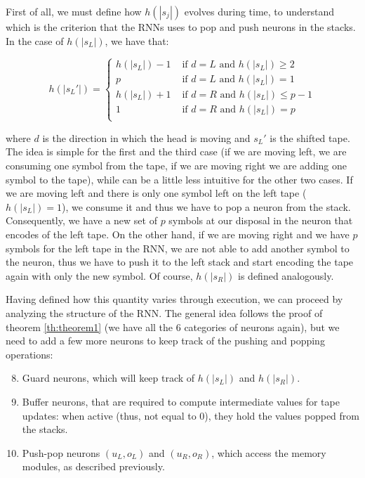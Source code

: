 \documentclass{article}
\begin{document}
First of all, we must define how $h(|s_j|)$ evolves during time, to understand which is the criterion that the RNNs uses to pop and push neurons in the stacks. In the case of $h(|s_L|)$, we have that:

\begin{equation}
    h(|s_L'|)=
    \begin{cases}
        h(|s_L|)-1 & \textrm{ if } d = L \textrm{ and } h(|s_L|) \geq 2\\
        p & \textrm{ if } d = L \textrm{ and } h(|s_L|) = 1\\
        h(|s_L|)+1 & \textrm{ if } d = R \textrm{ and } h(|s_L|) \leq p-1\\
        1 & \textrm{ if } d = R \textrm{ and } h(|s_L|) = p\\
    \end{cases}
\end{equation}

where $d$ is the direction in which the head is moving and $s_L'$ is the shifted tape. The idea is simple for the first and the third case (if we are moving left, we are consuming one symbol from the tape, if we are moving right we are adding one symbol to the tape), while can be a little less intuitive for the other two cases. If we are moving left and there is only one symbol left on the left tape ($h(|s_L|)=1$), we consume it and thus we have to pop a neuron from the stack. Consequently, we have a new set of $p$ symbols at our disposal in the neuron that encodes of the left tape. On the other hand, if we are moving right and we have $p$ symbols for the left tape in the RNN, we are not able to add another symbol to the neuron, thus we have to push it to the left stack and start encoding the tape again with only the new symbol. Of course, $h(|s_R|)$ is defined analogously.

Having defined how this quantity varies through execution, we can proceed by analyzing the structure of the RNN. The general idea follows the proof of theorem \ref{th:theorem1} (we have all the 6 categories of neurons again), but we need to add a few more neurons to keep track of the pushing and popping operations:

\begin{enumerate}
    \setcounter{enumi}{7}
    \item Guard neurons, which will keep track of $h(|s_L|)$ and $h(|s_R|)$.
    \item Buffer neurons, that are required to compute intermediate values for tape updates: when active (thus, not equal to $0$), they hold the values popped from the stacks.
    \item Push-pop neurons $(u_L,o_L)$ and $(u_R,o_R)$, which access the memory modules, as described previously.
\end{enumerate}
\end{document}
